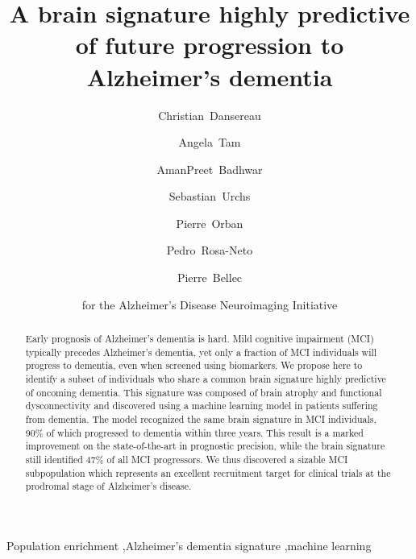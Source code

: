 \documentclass[authoryear]{elsarticle}
\begin{document}
\begin{frontmatter}
\title{A brain signature highly predictive of future progression to Alzheimer's dementia}

\author[a,b]{Christian~Dansereau}
\author[c]{Angela~Tam}
\author[a]{AmanPreet~Badhwar}
\author[c]{Sebastian~Urchs}
\author[a,e,f]{Pierre~Orban}
\author[d]{Pedro~Rosa-Neto}
\author[a,b]{Pierre~Bellec}
\author{for the Alzheimer's Disease Neuroimaging Initiative}




\address[a]{Centre de Recherche de l'Institut Universitaire de G\'eriatrie de Montr\'eal, Montr\'eal, CA}
\address[b]{D\'epartement d'Informatique et de recherche op\'erationnelle, Universit\'e de Montr\'eal, Montr\'eal,CA}
\address[c]{Integrated Program in Neuroscience, McGill University, Montr\'eal,CA}
\address[d]{Douglas Mental Health institute, McGill University, Montr\'eal,CA}
\address[e]{Centre de Recherche de l'Institut Universitaire en Sant\'e Mentale de Montr\'eal, Montr\'eal, CA}
\address[f]{D\'epartement de Psychiatrie, Universit\'e de Montr\'eal, Montr\'eal, CA}

%

\begin{abstract}
Early prognosis of Alzheimer's dementia is hard. Mild cognitive impairment (MCI) typically precedes Alzheimer's dementia, yet only a fraction of MCI individuals will progress to dementia, even when screened using biomarkers. We propose here to identify a subset of individuals who share a common brain signature highly predictive of oncoming dementia. This signature was composed of brain atrophy and functional dysconnectivity and discovered using a machine learning model in patients suffering from dementia. The model recognized the same brain signature in MCI individuals, 90\% of which progressed to dementia within three years. This result is a marked improvement on the state-of-the-art in prognostic precision, while the brain signature still identified 47\% of all MCI progressors. We thus discovered a sizable MCI subpopulation which represents an excellent recruitment target for clinical trials at the prodromal stage of Alzheimer's disease.
\end{abstract}

\begin{keyword}
Population enrichment \sep Alzheimer's dementia signature \sep machine learning
\end{keyword}
\end{frontmatter}
\end{document}
